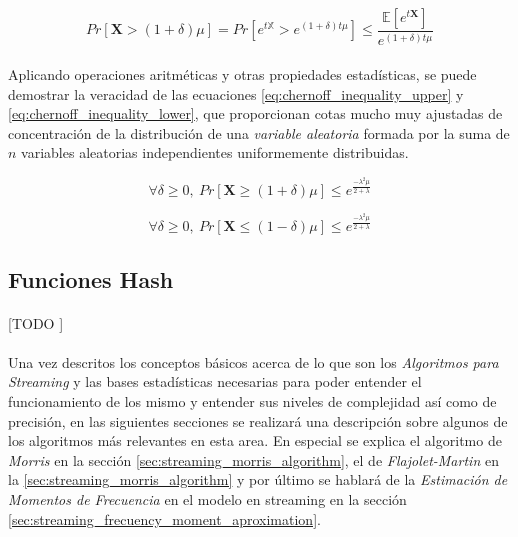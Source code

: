 \documentclass{subfiles}
\begin{document}
        \begin{equation}
        \label{eq:chernoff_inequality_raw}
          Pr[ \boldsymbol{X} > (1+\delta) \mu] =
          Pr[ e^{t \mathbb{X}} > e^{(1+\delta)t\mu}] \leq
          \frac{\mathbb{E}[ e^{t \boldsymbol{X}}] }{e^{(1 + \delta) t \mu}}
        \end{equation}

        \paragraph{}
        Aplicando operaciones aritméticas y otras propiedades estadísticas, se puede demostrar la veracidad de las ecuaciones \eqref{eq:chernoff_inequality_upper} y \eqref{eq:chernoff_inequality_lower}, que proporcionan cotas mucho muy ajustadas de concentración de la distribución de una \emph{variable aleatoria} formada por la suma de $n$ variables aleatorias independientes uniformemente distribuidas.

        \begin{equation}
        \label{eq:chernoff_inequality_upper}
          \forall \delta \geq 0, \ Pr[\boldsymbol{X} \geq (1 + \delta)\mu]  \leq e^\frac{-\lambda^2\mu}{2 + \lambda}
        \end{equation}

        \begin{equation}
        \label{eq:chernoff_inequality_lower}
          \forall \delta \geq 0, \ Pr[\boldsymbol{X} \leq (1 - \delta)\mu]  \leq e^\frac{-\lambda^2\mu}{2 + \lambda}
        \end{equation}

      \subsection{Funciones Hash}
      \label{sec:hash_functions}

        \paragraph{}
        [TODO ]

      \paragraph{}
      Una vez descritos los conceptos básicos acerca de lo que son los \emph{Algoritmos para Streaming} y las bases estadísticas necesarias para poder entender el funcionamiento de los mismo y entender sus niveles de complejidad así como de precisión, en las siguientes secciones se realizará una descripción sobre algunos de los algoritmos más relevantes en esta area. En especial se explica el algoritmo de \emph{Morris} en la sección \ref{sec:streaming_morris_algorithm}, el de \emph{Flajolet-Martin} en la \ref{sec:streaming_morris_algorithm} y por último se hablará de la \emph{Estimación de Momentos de Frecuencia} en el modelo en streaming en la sección \ref{sec:streaming_frecuency_moment_aproximation}.
\end{document}
